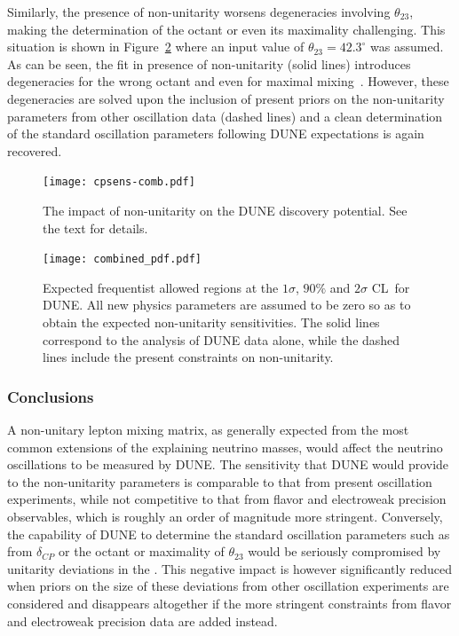 Similarly, the presence of non-unitarity worsens degeneracies involving $\theta_{23}$, making the determination of the octant or even its maximality challenging.
This situation is shown in Figure~\ref{fig:octant} where an input value of $\theta_{23} = 42.3^\circ$ was assumed. As can be seen, the fit in presence of non-unitarity (solid lines) introduces degeneracies for the wrong octant and even for maximal mixing~\cite{Blennow:2016jkn}. However, these degeneracies are solved upon the inclusion of present priors on the non-unitarity parameters from other oscillation data (dashed lines) and a clean determination of the standard oscillation parameters following DUNE expectations is again recovered.   

\begin{figure}[!t]
\centering
 \texttt{[image: cpsens-comb.pdf]}
\caption[Impact of non-unitarity on the CPV discovery potential]{The impact of non-unitarity on the DUNE  discovery potential. See the text for details.}
\label{fig:CPsens}
\end{figure}

\begin{figure}
 \texttt{[image: combined\_pdf.pdf]} 
 \begin{center}
  \caption[Expected frequentist allowed regions at the $1 \sigma$,
    $90\%$ and $2 \sigma$ CL\ ]{Expected frequentist allowed regions at the $1 \sigma$,
    $90\%$ and $2 \sigma$ CL\ for DUNE. All new physics parameters
    are assumed to be zero so as to obtain the expected
    non-unitarity sensitivities. The solid
    lines correspond to the analysis of DUNE data alone, while the
    dashed lines include the present constraints on non-unitarity.
\label{fig:octant}}
 \end{center}
\end{figure}

\subsubsection{Conclusions}
A non-unitary lepton mixing matrix, as generally expected from the most common extensions of the   explaining neutrino masses, would affect the neutrino oscillations to be measured by DUNE. The sensitivity that DUNE would provide to the non-unitarity parameters is comparable to that from present oscillation experiments, while not competitive to that from flavor and electroweak precision observables, which is roughly an order of magnitude more stringent. Conversely, the capability of DUNE to determine the standard oscillation parameters such as  from $\delta_{CP}$ or the octant or maximality of $\theta_{23}$ would be seriously compromised by unitarity deviations in the . This negative impact is however significantly reduced when priors on the size of these deviations from other oscillation experiments are considered and disappears altogether if the more stringent constraints from flavor and electroweak precision data are added instead.

